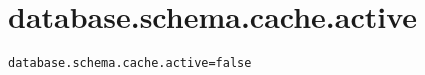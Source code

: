 \section{database.schema.cache.active}
\label{configuration:DatabaseSchemaCacheActive}
\AvailableInJavaOnly{\TODO}
\begin{lstlisting}[style=Props,caption={Usage example for \textit{database.schema.cache.active}}]
database.schema.cache.active=false
\end{lstlisting}